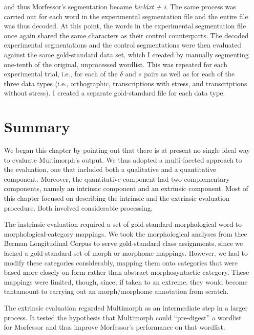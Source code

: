 {and thus Morfessor's segmentation became \textit{hicl\'{a}xt + i}.
The same process was carried out for each word in the experimental segmentation file and the entire file was thus decoded. At this point, the words in the experimental segmentation file once again shared the same characters as their control counterparts.
The decoded experimental segmentations and the control segmentations were then evaluated against the same gold-standard data set, which I created by manually segmenting 
one-tenth of the original, unprocessed wordlist. 
This was repeated for each experimental trial, i.e., for each of the $\delta$ and $s$ 
pairs as well as for each of the three data types (i.e., orthographic, transcriptions with stress, 
and transcriptions without stress).
I created a separate gold-standard file for each data type.

\section{Summary}
We began this chapter by pointing out that there is at present no single ideal way to evaluate Multimorph's output.
We thus adopted a multi-faceted approach to the evaluation, one that included both a qualitative and
a quantitative component. Moreover, the quantitative component had two complementary components, namely an intrinsic component and an extrinsic component. Most of this chapter focused on describing the intrinsic and the extrinsic evaluation procedure. Both involved considerable processing. 

The instrinsic evaluation required a set of gold-standard morphological word-to-morphological-category mappings. We took the morphological analyses from thee Berman Longitudinal Corpus to serve gold-standard class assignments, since we lacked a gold-standard set of morph or morphome mappings. However, we had to modify these categories considerably, mapping them onto categories that were based more closely on form rather than abstract morphosyntactic category. These mappings were limited, though, since, if taken to an extreme, they would become tantamount to carrying out an morph/morphome annotation from scratch.

The extrinsic evaluation regarded Multimorph as an intermediate step in a larger process. It tested the hypothesis that Multimorph could ``pre-digest'' a wordlist for Morfessor and thus improve Morfessor's performance on that
wordlist.

}
